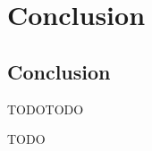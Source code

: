 \section{Conclusion}


\subsection{Conclusion}

\begin{frame}{TODO}{TODO}
    
    TODO

\end{frame}
\note{
}
